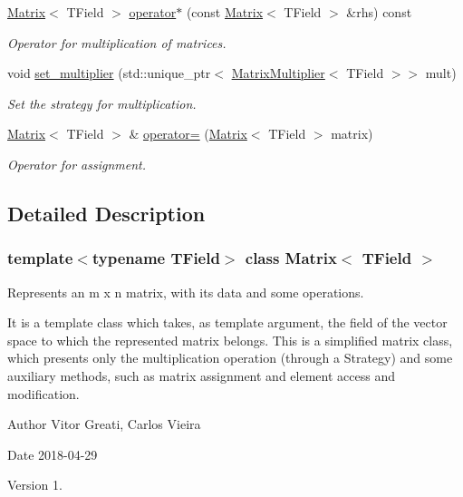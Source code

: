\begin{DoxyCompactItemize}
\mbox{\hyperlink{classMatrix}{Matrix}}$<$ T\+Field $>$ \mbox{\hyperlink{classMatrix_a76e19b560ed401d2b87f7c275533e9fb}{operator$\ast$}} (const \mbox{\hyperlink{classMatrix}{Matrix}}$<$ T\+Field $>$ \&rhs) const
\begin{DoxyCompactList}\small\item\em Operator for multiplication of matrices. \end{DoxyCompactList}\item 
void \mbox{\hyperlink{classMatrix_ac895b4ba9b119d16219b075675f581b4}{set\+\_\+multiplier}} (std\+::unique\+\_\+ptr$<$ \mbox{\hyperlink{classMatrixMultiplier}{Matrix\+Multiplier}}$<$ T\+Field $>$$>$ mult)
\begin{DoxyCompactList}\small\item\em Set the strategy for multiplication. \end{DoxyCompactList}\item 
\mbox{\hyperlink{classMatrix}{Matrix}}$<$ T\+Field $>$ \& \mbox{\hyperlink{classMatrix_ae8c4a30a41040e1d7ced1d76884e9c63}{operator=}} (\mbox{\hyperlink{classMatrix}{Matrix}}$<$ T\+Field $>$ matrix)
\begin{DoxyCompactList}\small\item\em Operator for assignment. \end{DoxyCompactList}\end{DoxyCompactItemize}


\subsection{Detailed Description}
\subsubsection*{template$<$typename T\+Field$>$\newline
class Matrix$<$ T\+Field $>$}

Represents an m x n matrix, with its data and some operations. 

It is a template class which takes, as template argument, the field of the vector space to which the represented matrix belongs. This is a simplified matrix class, which presents only the multiplication operation (through a Strategy) and some auxiliary methods, such as matrix assignment and element access and modification.

\begin{DoxyAuthor}{Author}
Vitor Greati, Carlos Vieira 
\end{DoxyAuthor}
\begin{DoxyDate}{Date}
2018-\/04-\/29 
\end{DoxyDate}
\begin{DoxyVersion}{Version}
1. 
\end{DoxyVersion}


